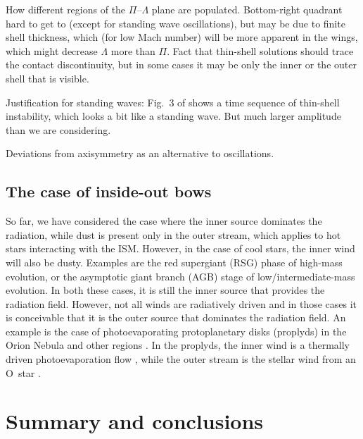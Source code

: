 How different regions of the \(\Pi\)--\(\Lambda\) plane are populated.
Bottom-right quadrant hard to get to (except for standing wave
oscillations), but may be due to finite shell thickness, which (for
low Mach number) will be more apparent in the wings, which might
decrease \(\Lambda\) more than \(\Pi\).  Fact that thin-shell solutions should
trace the contact discontinuity, but in some cases it may be only the
inner or the outer shell that is visible.

Justification for standing waves: Fig.~3 of \citet{Meyer:2016a} shows
a time sequence of thin-shell instability, which looks a bit like a
standing wave. But much larger amplitude than we are considering.

Deviations from axisymmetry as an alternative to oscillations. 


\subsection{The case of inside-out bows}
\label{sec:case-inside-out}

So far, we have considered the case where the inner source dominates
the radiation, while dust is present only in the outer stream, which
applies to hot stars interacting with the ISM.  However, in the case
of cool stars, the inner wind will also be dusty.  Examples are the
red supergiant (RSG) phase of high-mass evolution, or the asymptotic
giant branch (AGB) stage of low/intermediate-mass evolution.  In both
these cases, it is still the inner source that provides the radiation
field.  However, not all winds are radiatively driven and in those
cases it is conceivable that it is the outer source that dominates the
radiation field.  An example is the case of photoevaporating
protoplanetary disks (proplyds) in the Orion Nebula and other \hii{}
regions \citep{ODell:1994a}.  In the proplyds, the inner wind is a
thermally driven photoevaporation flow \citep{HA:1998, Henney:1999a},
while the outer stream is the stellar wind from an O~star
\citep{Garcia-Arredondo:2001a}.


\section{Summary and conclusions}
\label{sec:conclusions}



